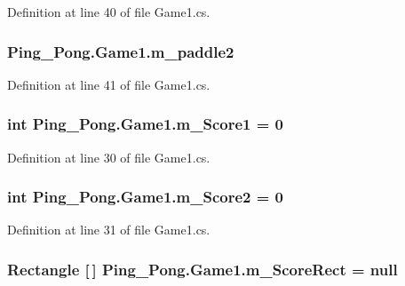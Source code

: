 Definition at line 40 of file Game1.\-cs.

\hypertarget{class_ping___pong_1_1_game1_a9735bd7df2c29d6196fbba528689dfa7}{
\subsubsection[{m\-\_\-paddle2}]{ Ping\-\_\-\-Pong.\-Game1.\-m\-\_\-paddle2\hspace{0.3cm}{\ttfamily [private]}}}\label{class_ping___pong_1_1_game1_a9735bd7df2c29d6196fbba528689dfa7}


Definition at line 41 of file Game1.\-cs.

\hypertarget{class_ping___pong_1_1_game1_a79cc64d39546f15bb7c9d169e5482444}{
\subsubsection[{m\-\_\-\-Score1}]{\setlength{\rightskip}{0pt plus 5cm}int Ping\-\_\-\-Pong.\-Game1.\-m\-\_\-\-Score1 = 0\hspace{0.3cm}{\ttfamily [private]}}}\label{class_ping___pong_1_1_game1_a79cc64d39546f15bb7c9d169e5482444}


Definition at line 30 of file Game1.\-cs.

\hypertarget{class_ping___pong_1_1_game1_ad54e91077ec0e426c351258e17fb2137}{
\subsubsection[{m\-\_\-\-Score2}]{\setlength{\rightskip}{0pt plus 5cm}int Ping\-\_\-\-Pong.\-Game1.\-m\-\_\-\-Score2 = 0\hspace{0.3cm}{\ttfamily [private]}}}\label{class_ping___pong_1_1_game1_ad54e91077ec0e426c351258e17fb2137}


Definition at line 31 of file Game1.\-cs.

\hypertarget{class_ping___pong_1_1_game1_a97f485fbb53d7daba3590705a5129e60}{
\subsubsection[{m\-\_\-\-Score\-Rect}]{\setlength{\rightskip}{0pt plus 5cm}Rectangle \mbox{[}$\,$\mbox{]} Ping\-\_\-\-Pong.\-Game1.\-m\-\_\-\-Score\-Rect = null\hspace{0.3cm}{\ttfamily [private]}}}\label{class_ping___pong_1_1_game1_a97f485fbb53d7daba3590705a5129e60}


